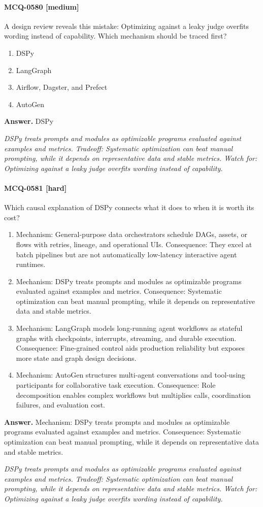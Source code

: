 \paragraph{MCQ-0580 [medium]} A design review reveals this mistake: Optimizing against a leaky judge overfits wording instead of capability. Which mechanism should be traced first?
\begin{enumerate}[label=\Alph*.]
\item DSPy
\item LangGraph
\item Airflow, Dagster, and Prefect
\item AutoGen
\end{enumerate}
\noindent\textbf{Answer.} DSPy
\par\textit{DSPy treats prompts and modules as optimizable programs evaluated against examples and metrics. Tradeoff: Systematic optimization can beat manual prompting, while it depends on representative data and stable metrics. Watch for: Optimizing against a leaky judge overfits wording instead of capability.}
\paragraph{MCQ-0581 [hard]} Which causal explanation of DSPy connects what it does to when it is worth its cost?
\begin{enumerate}[label=\Alph*.]
\item Mechanism: General-purpose data orchestrators schedule DAGs, assets, or flows with retries, lineage, and operational UIs. Consequence: They excel at batch pipelines but are not automatically low-latency interactive agent runtimes.
\item Mechanism: DSPy treats prompts and modules as optimizable programs evaluated against examples and metrics. Consequence: Systematic optimization can beat manual prompting, while it depends on representative data and stable metrics.
\item Mechanism: LangGraph models long-running agent workflows as stateful graphs with checkpoints, interrupts, streaming, and durable execution. Consequence: Fine-grained control aids production reliability but exposes more state and graph design decisions.
\item Mechanism: AutoGen structures multi-agent conversations and tool-using participants for collaborative task execution. Consequence: Role decomposition enables complex workflows but multiplies calls, coordination failures, and evaluation cost.
\end{enumerate}
\noindent\textbf{Answer.} Mechanism: DSPy treats prompts and modules as optimizable programs evaluated against examples and metrics. Consequence: Systematic optimization can beat manual prompting, while it depends on representative data and stable metrics.
\par\textit{DSPy treats prompts and modules as optimizable programs evaluated against examples and metrics. Tradeoff: Systematic optimization can beat manual prompting, while it depends on representative data and stable metrics. Watch for: Optimizing against a leaky judge overfits wording instead of capability.}

